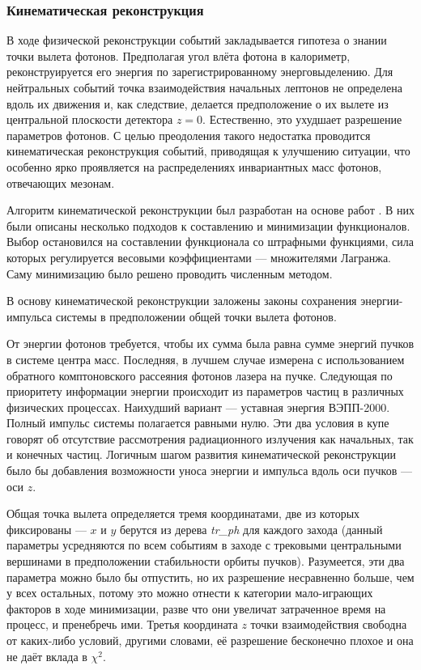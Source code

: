 \subsubsection{Кинематическая реконструкция}
\label{sec:kf}

В ходе физической реконструкции событий закладывается гипотеза о знании точки вылета фотонов.
Предполагая угол влёта фотона в калориметр,
реконструируется его энергия по зарегистрированному энерговыделению.
Для нейтральных событий точка взаимодействия начальных лептонов не определена вдоль их движения и,
как следствие,
делается предположение о их вылете из центральной плоскости детектора $z = 0$.
Естественно,
это ухудшает разрешение параметров фотонов.
С целью преодоления такого недостатка проводится кинематическая реконструкция событий,
приводящая к улучшению ситуации,
что особенно ярко проявляется на распределениях инвариантных масс фотонов,
отвечающих мезонам.

Алгоритм кинематической реконструкции был разработан на основе работ \cite{Bukin2003-27, Bukin2005-51, Bukin2008-3}.
В них были описаны несколько подходов к составлению и минимизации функционалов.
Выбор остановился на составлении функционала со штрафными функциями,
сила которых регулируется весовыми коэффициентами
---
множителями Лагранжа.
Саму минимизацию было решено проводить численным методом.

В основу кинематической реконструкции заложены законы сохранения энергии-импульса системы в предположении общей точки вылета фотонов.

От энергии фотонов требуется, чтобы их сумма была равна сумме энергий пучков в системе центра масс. Последняя, в лучшем случае измерена с использованием обратного комптоновского рассеяния фотонов лазера на пучке. Следующая по приоритету информации энергии происходит из параметров частиц в различных физических процессах. Наихудший вариант --- уставная энергия ВЭПП-2000. Полный импульс системы полагается равными нулю. Эти два условия в купе говорят об отсутствие рассмотрения радиационного излучения как начальных, так и конечных частиц.
Логичным шагом развития кинематической реконструкции было бы добавления возможности уноса энергии и импульса вдоль оси пучков --- оси $z$.

Общая точка вылета определяется тремя координатами, две из которых фиксированы --- $x$ и $y$ берутся из дерева \textit{tr\_ph} для каждого захода (данный параметры усредняются по всем событиям в заходе с трековыми центральными вершинами в предположении стабильности орбиты пучков).
Разумеется, эти два параметра можно было бы отпустить, но их разрешение несравненно больше, чем у всех остальных, потому это можно отнести к категории мало-играющих факторов в ходе минимизации, разве что они увеличат затраченное время на процесс, и пренебречь ими. 
Третья координата $z$ точки взаимодействия свободна от каких-либо условий, другими словами, её разрешение бесконечно плохое и она не даёт вклада в $\chi^2$.

